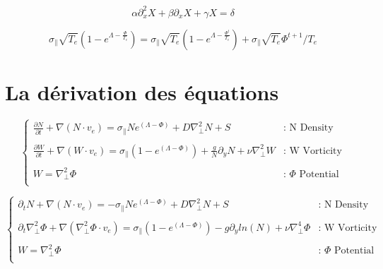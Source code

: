 \documentclass[12pt]{article}
\begin{document}
$$\alpha\partial^2_xX+\beta\partial_xX+\gamma X=\delta$$

$$\sigma_\parallel \sqrt{T_e}\left(1-e^{\Lambda-\frac{\Phi}{T_e}}\right)=\sigma_\parallel \sqrt{T_e}\left(1-e^{\Lambda-\frac{\Phi^{t}}{T_e}}\right)+\sigma_\parallel \sqrt{T_e}\Phi^{t+1}/T_e$$
	\section{La dérivation des équations} 
	

	$$\begin{cases}
		\displaystyle\frac{\partial N}{\partial t}+\nabla\left(N\cdot v_e\right)=\sigma_\parallel N e^{\left(\Lambda-\Phi\right)}+D\nabla^2_\perp N +S  
		&\text{: N Density}\\
		~\\
		\displaystyle\frac{\partial W}{\partial t}+\nabla\left(W\cdot v_e\right)=\sigma_\parallel \left(1-e^{\left(\Lambda-\Phi\right)}\right)+\frac{g}{N}\partial_y N+\nu\nabla^2_\perp W
		&\text{: W Vorticity} \\
		~\\
		\displaystyle W=\nabla^2_\perp\Phi
		&\text{:~} \Phi \text{~Potential} \\
	\end{cases}$$
	
	$$\begin{cases}
		\displaystyle\partial_t N+\nabla\left(N\cdot v_e\right)=-\sigma_\parallel N e^{\left(\Lambda-\Phi\right)}+D\nabla^2_\perp N +S  
		&\text{: N Density}\\
		~\\
		\displaystyle\partial_t{\nabla^2_\perp\Phi}+\nabla\left(\nabla^2_\perp\Phi\cdot v_e\right)=\sigma_\parallel \left(1-e^{\left(\Lambda-\Phi\right)}\right)-g\partial_y ln(N)+\nu\nabla^4_\perp\Phi
		&\text{: W Vorticity} \\
		~\\
		\displaystyle W=\nabla^2_\perp\Phi
		&\text{:~} \Phi \text{~Potential} \\
	\end{cases}$$
\end{document}
